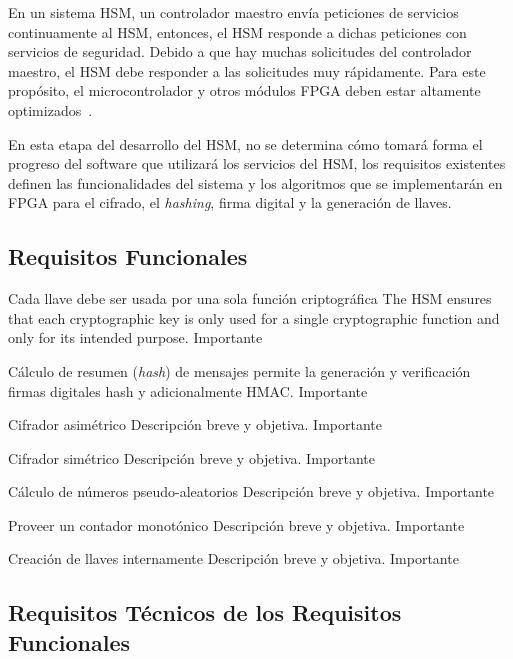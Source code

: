 \documentclass{article}
\begin{document}
En un sistema HSM, un controlador maestro envía peticiones de servicios continuamente al HSM, entonces, el HSM responde a dichas peticiones con servicios de seguridad. Debido a que hay muchas solicitudes del controlador maestro, el HSM debe responder a las solicitudes muy rápidamente. Para este propósito, el microcontrolador y otros módulos FPGA deben estar altamente optimizados~\cite{evita-hsm:2012}. 

En esta etapa del desarrollo del HSM, no se determina cómo tomará forma el progreso del software que utilizará los servicios del HSM, los requisitos existentes definen las funcionalidades del sistema y los algoritmos que se implementarán en FPGA para el cifrado, el \textit{hashing}, firma digital y la generación de llaves.

    \subsection{Requisitos Funcionales}
    \begin{functional}
		  {Cada llave debe ser usada por una sola función criptográfica}
      {The HSM ensures that each cryptographic key is only used for a single cryptographic function and only for its intended purpose.}
      {Importante}
    
		  {Cálculo de resumen (\textit{hash}) de mensajes}
      {permite la generación y verificación firmas digitales hash y adicionalmente HMAC.}
      {Importante}
			
      {Cifrador asimétrico}
      {Descripción breve y objetiva.}
      {Importante}
			
      {Cifrador simétrico}
      {Descripción breve y objetiva.}
      {Importante}
			
      {Cálculo de números pseudo-aleatorios}
      {Descripción breve y objetiva.}
      {Importante}
			
			{Proveer un contador monotónico}
			{Descripción breve y objetiva.}
			{Importante}
			
			{Creación de llaves internamente}
			{Descripción breve y objetiva.}
			{Importante}
			
    \end{functional}

  \subsection{Requisitos Técnicos de los Requisitos Funcionales}
  
\end{document}
